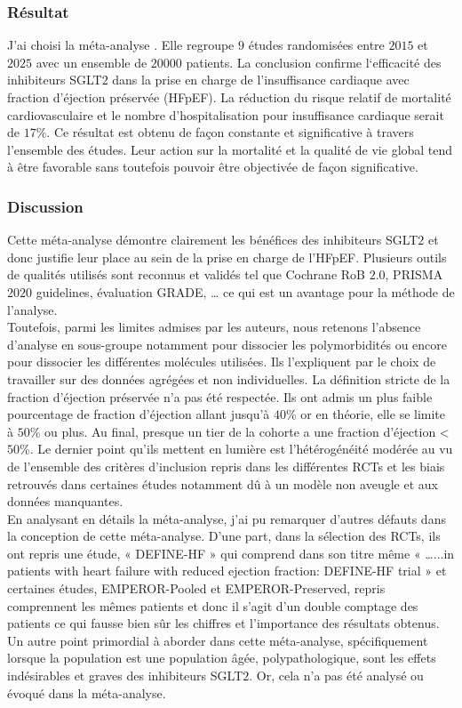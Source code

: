 \subsubsection{Résultat}
J’ai choisi la méta-analyse \textcite{minisy2025role}. Elle regroupe $9$ études randomisées entre $2015$ et $2025$ avec un ensemble de $20 000$ patients. La conclusion confirme l‘efficacité des inhibiteurs SGLT$2$ dans la prise en charge de l’insuffisance cardiaque avec fraction d’éjection préservée (HFpEF). La réduction du risque relatif de mortalité cardiovasculaire et le nombre d’hospitalisation pour insuffisance cardiaque serait de $17$\%. Ce résultat est obtenu de façon constante et significative à travers l’ensemble des études. Leur action sur la mortalité et la qualité de vie global tend à être favorable sans toutefois pouvoir être objectivée de façon significative. 

\subsubsection{Discussion}
Cette méta-analyse démontre clairement les bénéfices des inhibiteurs SGLT$2$ et donc justifie leur place au sein de la prise en charge de l’HFpEF. Plusieurs outils de qualités utilisés sont reconnus et validés tel que Cochrane RoB $2.0$, PRISMA $2020$ guidelines, évaluation GRADE, … ce qui est un avantage pour la méthode de l’analyse.\\

Toutefois, parmi les limites admises par les auteurs, nous retenons l’absence d’analyse en sous-groupe notamment pour dissocier les polymorbidités ou encore pour dissocier les différentes molécules utilisées. Ils l’expliquent par le choix de travailler sur des données agrégées et non individuelles. La définition stricte de la fraction d’éjection préservée n’a pas été respectée. Ils ont admis un plus faible pourcentage de fraction d’éjection allant jusqu’à $40$\% or en théorie, elle se limite à $50$\% ou plus. Au final, presque un tier de la cohorte a une fraction d’éjection <$50$\%. Le dernier point qu’ils mettent en lumière est l’hétérogénéité modérée au vu de l’ensemble des critères d’inclusion repris dans les différentes RCTs et les biais retrouvés dans certaines études notamment dû à un modèle non aveugle et aux données manquantes.\\

En analysant en détails la méta-analyse, j’ai pu remarquer d’autres défauts dans la conception de cette méta-analyse. D’une part, dans la sélection des RCTs, ils ont repris une étude, « DEFINE-HF » qui comprend dans son titre même « …...in patients with heart failure with reduced ejection fraction: DEFINE-HF trial » et certaines études, EMPEROR-Pooled et EMPEROR-Preserved, repris comprennent les mêmes patients et donc il s’agit d’un double comptage des patients ce qui fausse bien sûr les chiffres et l’importance des résultats obtenus. Un autre point primordial à aborder dans cette méta-analyse, spécifiquement lorsque la population est une population âgée, polypathologique, sont les effets indésirables et graves des inhibiteurs SGLT$2$. Or, cela n’a pas été analysé ou évoqué dans la méta-analyse.\\

